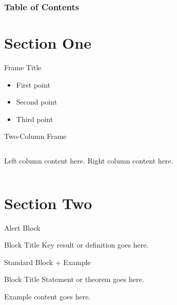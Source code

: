                                         
\frame{\titlepage}

\begin{frame}
\frametitle{Table of Contents}
\tableofcontents
\end{frame}

\section{Section One}

\begin{frame}{Frame Title}
  \begin{itemize}
    \item<1-> First point
    \item<2-> Second point
    \item<3-> Third point
  \end{itemize}
\end{frame}

\begin{frame}{Two-Column Frame}
  \begin{columns}
      Left column content here.
      Right column content here.
  \end{columns}
\end{frame}

\section{Section Two}

\begin{frame}{Alert Block}
  \begin{alertblock}{Block Title}
    Key result or definition goes here.
  \end{alertblock}
\end{frame}

\begin{frame}{Standard Block + Example}
  \begin{block}{Block Title}
    Statement or theorem goes here.
  \end{block}
  \begin{example}
    Example content goes here.
  \end{example}
\end{frame}

